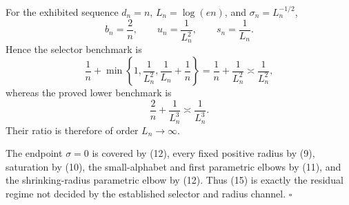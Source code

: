 For the exhibited sequence \(d_n=n\), \(L_n=\log(en)\), and \(\sigma_n=L_n^{-1/2}\),
\[
 b_n=\frac2n,\qquad u_n=\frac1{L_n^2},\qquad s_n=\frac1{L_n}.
\tag{17}
\]
Hence the selector benchmark is
\[
 \frac1n+\min\left\{1,\frac1{L_n^2},\frac1{L_n}+\frac1n\right\}
 =\frac1n+\frac1{L_n^2}
 \asymp\frac1{L_n^2},
\tag{18}
\]
whereas the proved lower benchmark is
\[
 \frac2n+\frac1{L_n^3}
 \asymp\frac1{L_n^3}.
\tag{19}
\]
Their ratio is therefore of order \(L_n\to\infty\).

The endpoint \(\sigma=0\) is covered by (12), every fixed positive radius by (9), saturation by (10), the small-alphabet and first parametric elbows by (11), and the shrinking-radius parametric elbow by (12).  Thus (15) is exactly the residual regime not decided by the established selector and radius channel. \(\square\)